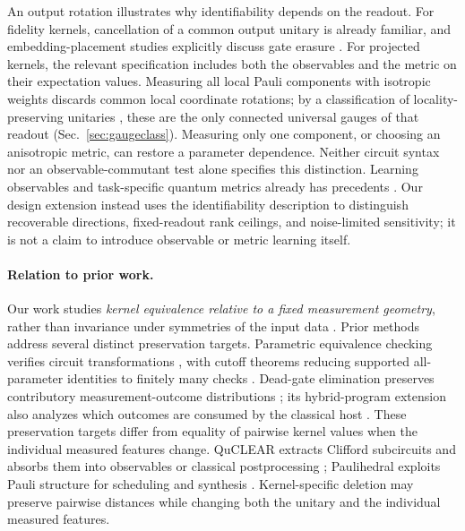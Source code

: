 \documentclass[a4paper,twocolumn,11pt,unpublished]{quantumarticle}
\begin{document}
An output rotation illustrates why identifiability depends on the
readout. For fidelity kernels, cancellation of a common output unitary is
already familiar, and embedding-placement studies explicitly discuss
gate erasure \cite{salmenpera}. For projected kernels, the relevant
specification includes both the observables and the metric on their
expectation values. Measuring all local Pauli components with isotropic
weights discards common local coordinate rotations; by a classification
of locality-preserving unitaries \cite{cpr2019locality}, these are the
only connected universal gauges of that readout
(Sec.~\ref{sec:gaugeclass}). Measuring only
one component, or choosing an anisotropic metric, can restore a
parameter dependence. Neither circuit syntax nor an observable-commutant
test alone specifies this distinction.
Learning observables and task-specific quantum metrics already has precedents
\cite{chenMeasure2025,changMetric2022}. Our design extension instead
uses the identifiability description to distinguish recoverable
directions, fixed-readout rank ceilings, and noise-limited sensitivity;
it is not a claim to introduce observable or metric learning itself.

\paragraph{Relation to prior work.}
Our work studies \emph{kernel equivalence relative to a fixed
measurement geometry}, rather than invariance under symmetries of
the input data \cite{larocca,meyer}. Prior methods address several
distinct preservation targets. Parametric equivalence checking
verifies circuit transformations \cite{peham}, with cutoff theorems
reducing supported all-parameter identities to finitely many checks
\cite{rosswesley}. Dead-gate elimination preserves contributory
measurement-outcome distributions \cite{deadgate}; its hybrid-program
extension also analyzes which outcomes are consumed by the classical
host \cite{deadgatejournal}. These preservation targets differ from
equality of pairwise kernel values when the individual measured
features change. QuCLEAR extracts
Clifford subcircuits and absorbs them into observables or classical
postprocessing \cite{quclear}; Paulihedral exploits Pauli structure
for scheduling and synthesis \cite{paulihedral}. Kernel-specific
deletion may preserve pairwise distances while changing both the
unitary and the individual measured features.
\end{document}
